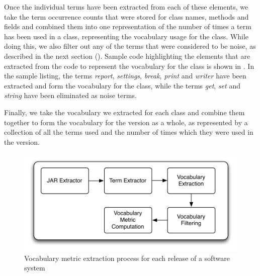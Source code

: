 Once the individual terms have been extracted from each of these elements, we take the term occurrence counts that were stored for class names, methods and fields and combined them into one representation of the number of times a term has been used in a class, representing the vocabulary usage for the class. While doing this, we also filter out any of the terms that were considered to be noise, as described in the next section (). Sample code highlighting the elements that are extracted from the code to represent the vocabulary for the class is shown in . In the sample listing, the terms \emph{report}, \emph{settings}, \emph{break}, \emph{print} and \emph{writer} have been extracted and form the vocabulary for the class, while the terms \emph{get}, \emph{set} and \emph{string} have been eliminated as noise terms.

Finally, we take the vocabulary we extracted for each class and combine them together to form the vocabulary for the version as a whole, as represented by a collection of all the terms used and the number of times which they were used in the version.

\begin{figure}[t]
\centering
\includegraphics[width=\textwidth]{Figures/Vocab-VocabMetricExtraction.pdf}
\caption{Vocabulary metric extraction process for each release of a software system}
\label{fig:vocab_metric_extraction}
\end{figure}

